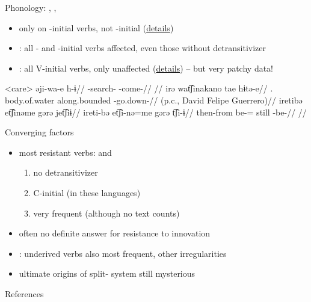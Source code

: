 \documentclass[9pt]{beamer}
\begin{document}
\begin{frame}[allowframebreaks]{Phonology: \akuriyo, \carijo, \yukpa}
\begin{itemize}
	\item \akuriyo {} only on -initial verbs, not -initial (\hyperlink{aku}{details})
	\item \carijo: all - and -initial verbs affected, even those without detransitivizer 
	\item \yukpa: all V-initial verbs, only   unaffected (\hyperlink{yukpaj}{details}) -- but very patchy data!
\end{itemize}
\footnotesize
\pex<care>\carijo
{}
\begingl
\gla əji-wa-e h-ɨ//
\glb {}-search- -come-//
\glft {} \parencite[][102]{guerrero2019carijo}//
\endgl
{}
\begingl
\gla irə wat͡ʃinakano tae hɨtə-e//
\glb {}. body.of.water along.bounded -go.down-//
\glft {} (p.c., David Felipe Guerrero)//
\endgl
{}
\begingl
\glpreamble iretibə et͡ʃinəme gərə jet͡ʃiɨ//
\gla ireti-bə et͡ʃi-nə=me gərə t͡ʃi-ɨ//
\glb then-from be-= still -be-//
\glft {} \parencite[][177]{robayo1989rame}//
\endgl
\xe
\end{frame}

\begin{frame}{Converging factors}
\begin{itemize}
	\item most resistant verbs:   and  \begin{enumerate}
	\item no detransitivizer
	\item C-initial (in these languages)
	\item very frequent (although no text counts)
	\end{enumerate}
\item often no definite answer for resistance to innovation
\item \PC: underived  verbs also most frequent, other irregularities
\item ultimate origins of split- system still mysterious
\end{itemize}
\end{frame}

\renewcommand*{\bibfont}{\tiny}
\begin{frame}[allowframebreaks]{References}
\printbibliography
\end{frame}
\end{document}

